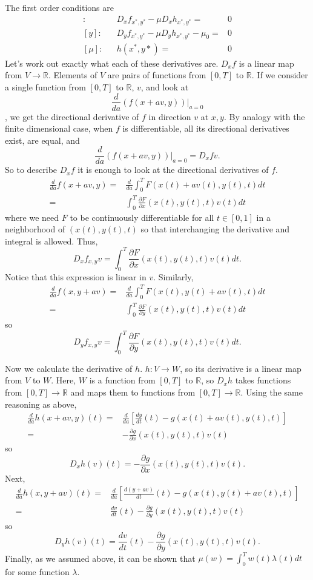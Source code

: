 \documentclass[12pt,reqno]{amsart}
\theoremstyle{definition}
\def\R{\mathbb{R}}
\renewcommand{\to}{{\rightarrow}}
\begin{document}
The first order conditions are
\begin{align}
  [x]: && D_xf_{x^*,y^*} - \mu D_xh_{x^*,y^*} = & 0 \\
  [y]: && D_yf_{x^*,y^*} - \mu D_yh_{x^*,y^*} - \mu_0 = & 0 \\
  [\mu]: && h(x^*,y*) = & 0 
\end{align}
Let's work out exactly what each of these derivatives are. $D_xf$ is a
linear map from $V \to \R$. Elements of $V$ are pairs of functions from
$[0,T]$ to $\R$. If we consider a single function from $[0,T]$ to
$\R$, $v$, and look at 
\[ \frac{d}{d a} \left(f(x+a v,y) \right)|_{a=0} \],
we get the directional derivative of $f$ in direction $v$ at $x,y$. By
analogy with the finite dimensional case, when $f$ is differentiable,
all its directional derivatives exist, are equal, and 
\[ \frac{d}{d a} \left(f(x+a v,y) \right)|_{a=0}  = D_x f v. \]
So to describe $D_xf$ it is enough to look at the directional
derivatives of $f$. 
\begin{align*}
  \frac{d}{d a} f(x+a v,y) = & \frac{d}{da}  \int_0^T F(x(t)+a
  v(t),y(t),t) dt \\
  = & \int_0^T \frac{\partial F}{\partial x}(x(t),y(t),t) v(t) dt
\end{align*}
where we need $F$ to be continuously differentiable for 
all $t \in
[0,1]$ in a neighborhood of $(x(t),y(t),t)$ so that interchanging the
derivative and integral is allowed. Thus,
\[ D_x f_{x,y} v = \int_0^T \frac{\partial F}{\partial x}(x(t),y(t),t)
v(t) dt. \]
Notice that this expression is linear in $v$. Similarly,
\begin{align*}
  \frac{d}{d a} f(x,y+av) = & \frac{d}{da}  \int_0^T
  F(x(t),y(t)+av(t),t) dt 
   \\
  = & \int_0^T \frac{\partial F}{\partial y}(x(t),y(t),t) v(t) dt   
\end{align*}
so 
\[ D_y f_{x,y}v  =  \int_0^T \frac{\partial F}{\partial y}(x(t),y(t),t)
v(t) dt. \]

Now we calculate the derivative of $h$. $h:V \to W$, so its derivative
is a linear map from $V$ to $W$. Here, $W$ is a function from $[0,T]$
to $\R$, so $D_x h$ takes functions from $[0,T] \to \R$ and maps them
to functions from $[0,T] \to \R$. Using the same reasoning as above,
\begin{align*}
  \frac{d}{d a} h(x+av,y)(t) = & \frac{d}{da}\left[
     \frac{dy}{dt}(t) - g(x(t)+av(t),y(t),t)\right] \\
   = & - \frac{\partial g}{\partial x}(x(t),y(t),t) v(t) 
 \end{align*}
so
\[ D_xh(v)(t) = -\frac{\partial g}{\partial x}(x(t),y(t),t) v(t). \]
Next,
\begin{align*}
  \frac{d}{d a} h(x,y+av)(t) = & \frac{d}{da}\left[
     \frac{d(y+av)}{dt}(t) - g(x(t),y(t)+av(t),t)\right] \\
   = & \frac{d v}{dt}(t) - \frac{\partial g}{\partial y}(x(t),y(t),t) v(t) 
 \end{align*}
so 
\[ D_yh(v)(t) = \frac{d v}{dt}(t) - \frac{\partial g}{\partial
  y}(x(t),y(t),t) v(t). \]
Finally, as we assumed above, it can be shown that $\mu(w) = \int_0^T
w(t) \lambda(t) dt$ for some function $\lambda$. 
\end{document}
